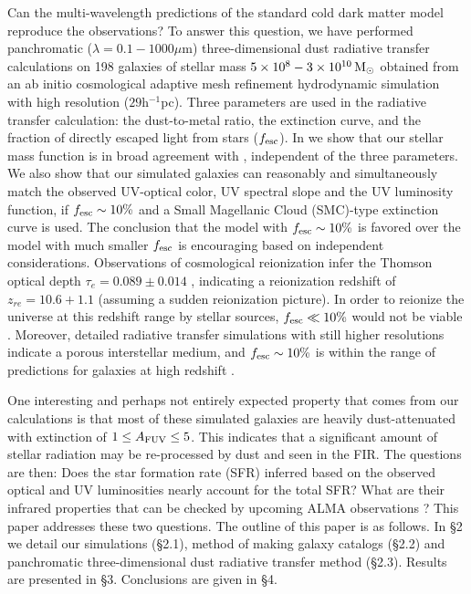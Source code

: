 Can the multi-wavelength predictions of the standard cold dark matter model reproduce the observations?
To answer this question, we have performed 
panchromatic ($\lambda=0.1-1000\mu$m) three-dimensional dust radiative transfer 
calculations on 198 galaxies of stellar mass $5\times 10^8-3\times10^{10}{\rm\,M_\odot}$ 
obtained from an ab initio cosmological adaptive mesh refinement hydrodynamic simulation 
with high resolution ($29$h$^{-1}$pc). 
Three parameters are used in the radiative transfer calculation: the dust-to-metal ratio, the extinction curve, 
and the fraction of directly escaped light from stars ($f_{\rm esc}$). 
In \citet{2013Kimm} we show that our stellar mass function is in broad agreement with \citet{2011Gonzalez}, independent of the three parameters. 
We also show that our simulated galaxies can reasonably and simultaneously match the 
observed UV-optical color, UV spectral slope and the 
UV luminosity function, if $f_{\rm esc}\sim10\%$ and a Small Magellanic Cloud (SMC)-type extinction curve is used. 
The conclusion that the model with $f_{\rm esc}\sim 10\%$ is favored over the model with much smaller $f_{\rm esc}$ 
is encouraging based on independent considerations.
Observations of cosmological reionization infer the Thomson optical 
depth $\tau_e = 0.089 \pm 0.014$ \citep[][]{2012Hinshaw}, indicating a reionization
redshift of $z_{re}=10.6 + 1.1$ (assuming a sudden reionization picture). 
In order to reionize the universe at this redshift range by stellar sources, 
$f_{\rm esc} \ll 10\%$ would not be viable \citep[e.g.,][]{2003Cen}.
Moreover, detailed radiative transfer simulations with still higher resolutions indicate a porous interstellar medium, and
$f_{\rm esc}\sim 10\%$ is within the range of predictions for galaxies at high redshift
\citep[e.g.,][]{2009Wise, 2010Razoumov, 2011Yajima}.


One interesting and perhaps not entirely expected property that comes from our calculations is that 
most of these simulated galaxies are heavily dust-attenuated 
with extinction of $1\le A_{\rm FUV}\le 5$.
This indicates that a significant amount of stellar radiation may be re-processed by
dust and seen in the FIR.
The questions are then: 
Does the star formation rate (SFR) inferred
based on the observed optical and UV luminosities nearly account for the total SFR? 
What are their infrared properties that can be checked by upcoming ALMA observations
\citep[e.g.,][]{2008Carilli,2013Hodge}?
This paper addresses these two questions.
The outline of this paper is as follows.
In \S 2 we detail our simulations (\S 2.1), method of making galaxy catalogs (\S 2.2) and 
panchromatic three-dimensional dust radiative transfer method (\S 2.3).
Results are presented in \S 3.
Conclusions are given in \S 4.





